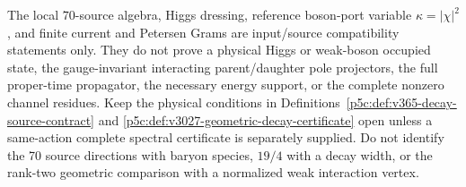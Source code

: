 \documentclass[12pt,a4paper]{article}
\begin{document}
\begin{remark}
\label{p5c:rem:v368-geometry-source-certificate-frontier}
The local $70$-source algebra, Higgs dressing, reference boson-port
variable $\kappa=|\chi|^2$, and finite current and Petersen Grams
are input/source compatibility statements only. They do not prove a
physical Higgs or weak-boson occupied state, the gauge-invariant
interacting parent/daughter pole projectors, the full proper-time
propagator, the necessary energy support, or the complete nonzero
channel residues. Keep the physical conditions in
Definitions~\ref{p5c:def:v365-decay-source-contract} and
\ref{p5c:def:v3027-geometric-decay-certificate} open unless a
same-action complete spectral certificate is separately supplied.
Do not identify the 70 source directions with baryon species,
$19/4$ with a decay width, or the rank-two geometric comparison
with a normalized weak interaction vertex.
\end{remark}
\end{document}
